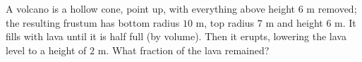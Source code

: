 A volcano is a hollow cone, point up, with everything above height $6$ m removed; the resulting frustum has bottom radius $10$ m, top radius $7$ m and height $6$ m. It fills with lava until it is half full (by volume). Then it erupts, lowering the lava level to a height of $2$ m. What fraction of the lava remained?
